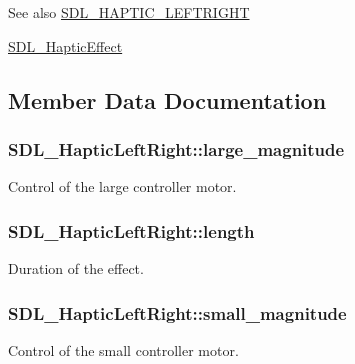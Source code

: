 \begin{DoxySeeAlso}{See also}
\hyperlink{_s_d_l__haptic_8h_ae047624d8458ff6400887c37a36f86d3}{S\+D\+L\+\_\+\+H\+A\+P\+T\+I\+C\+\_\+\+L\+E\+F\+T\+R\+I\+G\+H\+T} 

\hyperlink{union_s_d_l___haptic_effect}{S\+D\+L\+\_\+\+Haptic\+Effect} 
\end{DoxySeeAlso}


\subsection{Member Data Documentation}
\hypertarget{struct_s_d_l___haptic_left_right_a8cd16fe2200ef10cc4f3b4209adef959}{}
\subsubsection[{large\+\_\+magnitude}]{ S\+D\+L\+\_\+\+Haptic\+Left\+Right\+::large\+\_\+magnitude}\label{struct_s_d_l___haptic_left_right_a8cd16fe2200ef10cc4f3b4209adef959}
Control of the large controller motor. \hypertarget{struct_s_d_l___haptic_left_right_a5b942fee53f1ec77d3fb91a6e89b0196}{}
\subsubsection[{length}]{ S\+D\+L\+\_\+\+Haptic\+Left\+Right\+::length}\label{struct_s_d_l___haptic_left_right_a5b942fee53f1ec77d3fb91a6e89b0196}
Duration of the effect. \hypertarget{struct_s_d_l___haptic_left_right_aaa1f2c1e767a780e447d82efce6cd1cf}{}
\subsubsection[{small\+\_\+magnitude}]{ S\+D\+L\+\_\+\+Haptic\+Left\+Right\+::small\+\_\+magnitude}\label{struct_s_d_l___haptic_left_right_aaa1f2c1e767a780e447d82efce6cd1cf}
Control of the small controller motor. \hypertarget{struct_s_d_l___haptic_left_right_abef79eeb482a8e623e512f0c9635e1a1}{}
